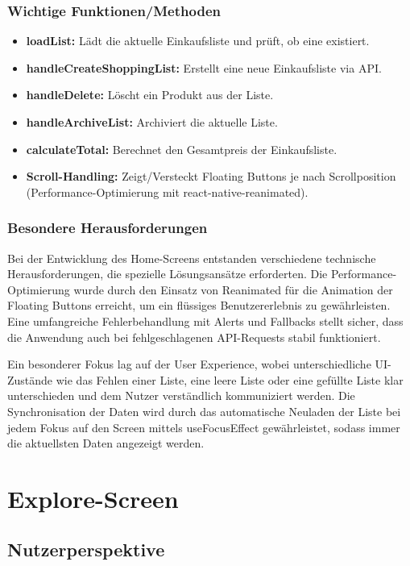 \subsubsection{Wichtige Funktionen/Methoden}
\begin{itemize}
    \item \textbf{loadList:} Lädt die aktuelle Einkaufsliste und prüft, ob eine existiert.
    \item \textbf{handleCreateShoppingList:} Erstellt eine neue Einkaufsliste via API.
    \item \textbf{handleDelete:} Löscht ein Produkt aus der Liste.
    \item \textbf{handleArchiveList:} Archiviert die aktuelle Liste.
    \item \textbf{calculateTotal:} Berechnet den Gesamtpreis der Einkaufsliste.
    \item \textbf{Scroll-Handling:} Zeigt/Versteckt Floating Buttons je nach Scrollposition (Performance-Optimierung mit react-native-reanimated).
\end{itemize}

\subsubsection{Besondere Herausforderungen}
Bei der Entwicklung des Home-Screens entstanden verschiedene technische Herausforderungen, die spezielle Lösungsansätze erforderten. Die Performance-Optimierung wurde durch den Einsatz von Reanimated für die Animation der Floating Buttons erreicht, um ein flüssiges Benutzererlebnis zu gewährleisten. Eine umfangreiche Fehlerbehandlung mit Alerts und Fallbacks stellt sicher, dass die Anwendung auch bei fehlgeschlagenen API-Requests stabil funktioniert.

Ein besonderer Fokus lag auf der User Experience, wobei unterschiedliche UI-Zustände wie das Fehlen einer Liste, eine leere Liste oder eine gefüllte Liste klar unterschieden und dem Nutzer verständlich kommuniziert werden. Die Synchronisation der Daten wird durch das automatische Neuladen der Liste bei jedem Fokus auf den Screen mittels useFocusEffect gewährleistet, sodass immer die aktuellsten Daten angezeigt werden.

\section{Explore-Screen}
\label{sec:explore_screen}

\subsection{Nutzerperspektive}

